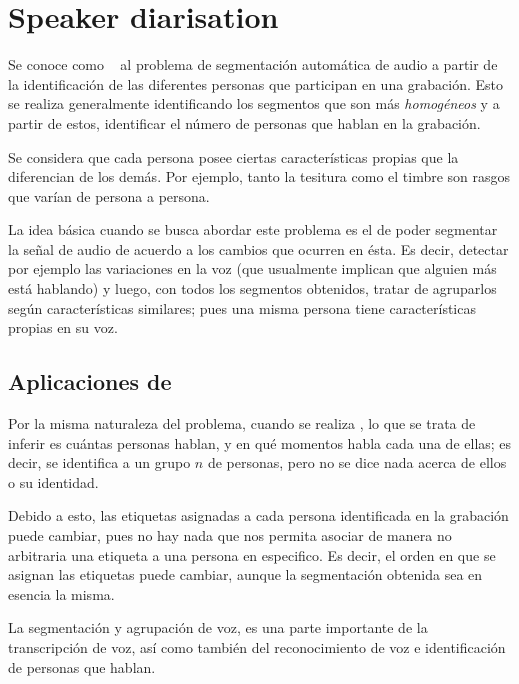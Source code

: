
\chapter{Speaker diarisation} \label{ch:chap2}

 
Se conoce como \SD~ al problema de segmentación automática de audio a partir de la identificación de las diferentes personas que participan en una grabación. Esto se realiza generalmente identificando los segmentos que son más \textit{homogéneos} y a partir de estos, identificar el número de personas que hablan en la grabación.

Se considera que cada persona posee ciertas características propias que la diferencian de los demás. Por ejemplo, tanto la tesitura como el timbre son rasgos que varían de persona a persona.

La idea básica cuando se busca abordar este problema es el de poder segmentar la señal de audio de acuerdo a los cambios que ocurren en ésta. Es decir, detectar por ejemplo las variaciones en la voz (que usualmente implican que alguien más está hablando) y luego, con todos los segmentos obtenidos, tratar de agruparlos según características similares; pues una misma persona tiene características propias en su voz. 

\section{Aplicaciones de \sd}

Por la misma naturaleza del problema, cuando se realiza \sd, lo que se trata de inferir es cuántas personas hablan, y en qué momentos habla cada una de ellas; es decir, se identifica a un grupo $n$ de personas, pero no se dice nada acerca de ellos o su identidad. 

Debido a esto, las etiquetas asignadas a cada persona identificada en la grabación puede cambiar, pues no hay nada que nos permita asociar de manera no arbitraria una etiqueta a una persona en especifico. Es decir, el orden en que se asignan las etiquetas puede cambiar, aunque la segmentación obtenida sea en esencia la misma.

La segmentación y agrupación de voz, es una parte importante de la transcripción de voz, así como también del reconocimiento de voz e identificación de personas que hablan. 

